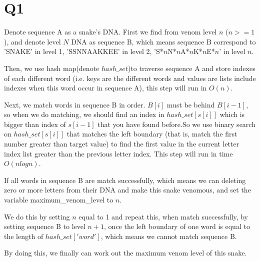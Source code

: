 \documentclass[a4paper]{article}
\begin{document}
	\section*{Q1}
	Denote sequence A as a snake’s DNA.
	First we find from venom level $n$ ($n >= 1$), and denote level $N$ DNA as sequence B, which means sequence B correspond to 'SNAKE' in level 1, 'SSNNAAKKEE' in level 2, 'S*$n$N*$n$A*$n$K*$n$E*$n$' in level $n$.
	
	Then, we use hash map(denote $hash\_set$)to traverse sequence A and store indexes of each different word (i.e. keys are the different words and values are lists include indexes when this word occur in sequence A), this step will run in $O(n)$.
	
	Next, we match words in sequence B in order. $B[i]$ must be behind $B[i-1]$, so when we do matching, we should find an index in $hash\_set[s[i]]$ which is bigger than index of $s[i-1]$ that you have found before.So we use binary search on $hash\_set[s[i]]$ that matches the left boundary (that is, match the first number greater than target value) to find the first value in the current letter index list greater than the previous letter index. This step will run in time $O(nlog n)$.
	
	If all words in sequence B are match successfully, which means we can deleting zero or more letters from their DNA and make this snake venomous, and set the variable maximum\_venom\_level to $n$. 
	
	We do this by setting $n$ equal to 1 and repeat this, when match successfully, by setting sequence B to level $n+1$, once the left boundary of one word is equal to the length of $hash\_set['word']$, which means we cannot match sequence B.
		
	
	
%	
	By doing this, we finally can work out the maximum venom level of this snake.
	
\end{document}
